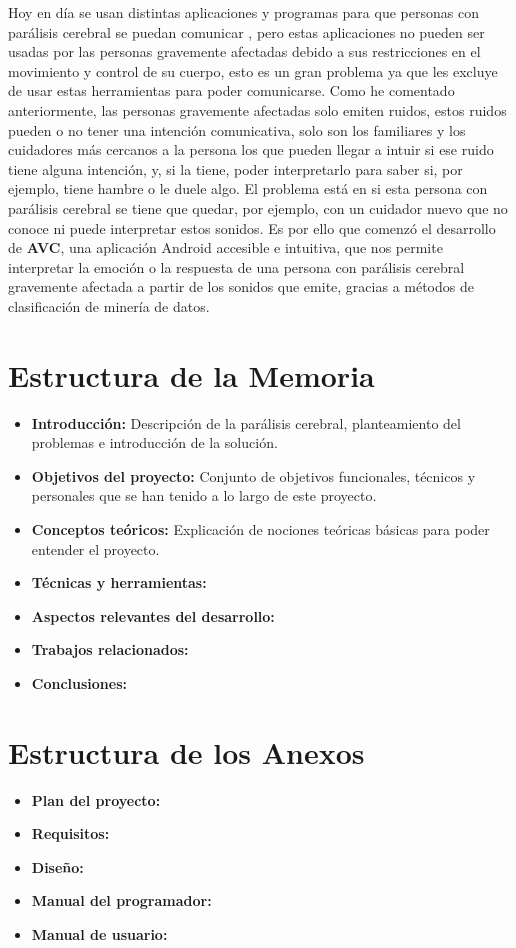 Hoy en día se usan distintas aplicaciones y programas para que personas con parálisis cerebral se puedan comunicar \cite{jocomunico}, pero estas aplicaciones no pueden ser usadas por las personas gravemente afectadas debido a sus restricciones en el movimiento y control de su cuerpo, esto es un gran problema ya que les excluye de usar estas herramientas para poder comunicarse. Como he comentado anteriormente, las personas gravemente afectadas solo emiten ruidos, estos ruidos pueden o no tener una intención comunicativa, solo son los familiares y los cuidadores más cercanos a la persona los que pueden llegar a intuir si ese ruido tiene alguna intención, y, si la tiene, poder interpretarlo para saber si, por ejemplo, tiene hambre o le duele algo. El problema está en si esta persona con parálisis cerebral se tiene que quedar, por ejemplo, con un cuidador nuevo que no conoce ni puede interpretar estos sonidos. Es por ello que comenzó el desarrollo de \textbf{AVC}, una aplicación Android accesible e intuitiva, que nos permite interpretar la emoción o la respuesta de una persona con parálisis cerebral gravemente afectada a partir de los sonidos que emite, gracias a métodos de clasificación de minería de datos.

\section{Estructura de la Memoria}
\begin{itemize}
	\item 
		\textbf{Introducción:} Descripción de la parálisis cerebral, planteamiento del problemas e introducción de la solución.
	\item
		\textbf{Objetivos del proyecto:} Conjunto de objetivos funcionales, técnicos y personales que se han tenido a lo largo de este proyecto.
	\item
		\textbf{Conceptos teóricos:} Explicación de nociones teóricas básicas para poder entender el proyecto.
	\item
		\textbf{Técnicas y herramientas:}
	\item
		\textbf{Aspectos relevantes del desarrollo:}
	\item
		\textbf{Trabajos relacionados:}
	\item
		\textbf{Conclusiones:}
\end{itemize}

\section{Estructura de los Anexos}
\begin{itemize}
	\item
	\textbf{Plan del proyecto:}
	\item
	\textbf{Requisitos:}
	\item
	\textbf{Diseño:}
	\item
	\textbf{Manual del programador:}
	\item
	\textbf{Manual de usuario:}	
\end{itemize}

